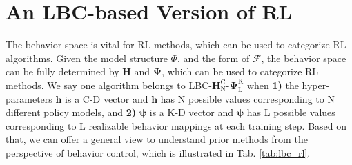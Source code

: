 \section{An LBC-based Version of RL}
\label{app: An LBC-based Version of RL}
The behavior space is vital for RL methods, which can be used to categorize RL algorithms. Given the model structure $\Phi$, and the form of $\mathcal{F}$, the behavior space can be fully determined by $\mathbf{H}$ and $\bm{\Psi}$, which can be used to categorize RL methods. We say one algorithm belongs to LBC-$\mathbf{H}_{\text{N}}^{\text{C}}$-$\bm{\Psi}_{\text{L}}^{\text{K}}$ when \textbf{1)} the hyper-parameters $\mathbf{h}$ is a C-D vector and $\mathbf{h}$ has N possible values corresponding to N different policy models, and \textbf{2)} $\bm{\psi}$ is a K-D vector and $\bm{\psi}$ has L possible values corresponding to L realizable behavior mappings at each training step. Based on that, we can offer a general view to understand prior methods from the perspective of behavior control, which is illustrated in Tab. \ref{tab:lbc_rl}.
\begin{comment}
    虽然总空间是$N \times L$，但是这个空间是受限的，并不是每一个点都能全部取到。对于每个actor来说，他只能从N个model中做出选择。
\end{comment}

